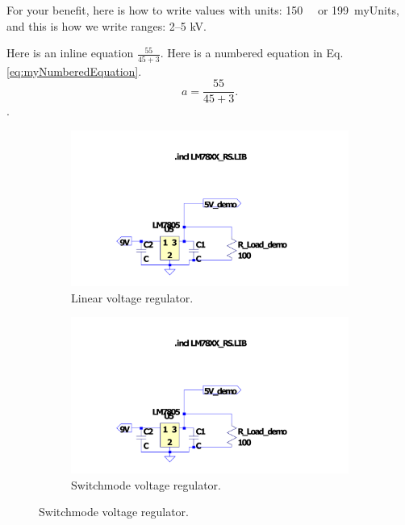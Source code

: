 For your benefit, here is how to write values with units: \SI{150}{\milli\Omega} or \SI{199}{myUnits}, and this is how we write ranges: \numrange{2}{5} \si{\kilo\volt}.

Here is an inline equation $ \frac{55}{45+3}$. Here is a numbered equation in Eq. \ref{eq:myNumberedEquation}.
\begin{equation}
   a = \frac{55}{45+3}
   \label{eq:myNumberedEquation}. 
\end{equation}. 

\begin{figure}
 \footnotesize
   \centering
   \begin{subfigure}[]{0.45\textwidth}
        \includegraphics[width=\linewidth]{./Figures/E344_Ass1VoltRegulator_cct}
	  \caption{Linear voltage regulator.} \label{subfig:linear_circuit_diagram}	
   \end{subfigure}
   \begin{subfigure}[]{0.45\textwidth}
  	 \includegraphics[width=\linewidth]{./Figures/E344_Ass1VoltRegulator_cct}
	  \caption{Switchmode voltage regulator.} \label{subfig:switchmode_circuit_diagram}	
   \end{subfigure}

\end{figure}
